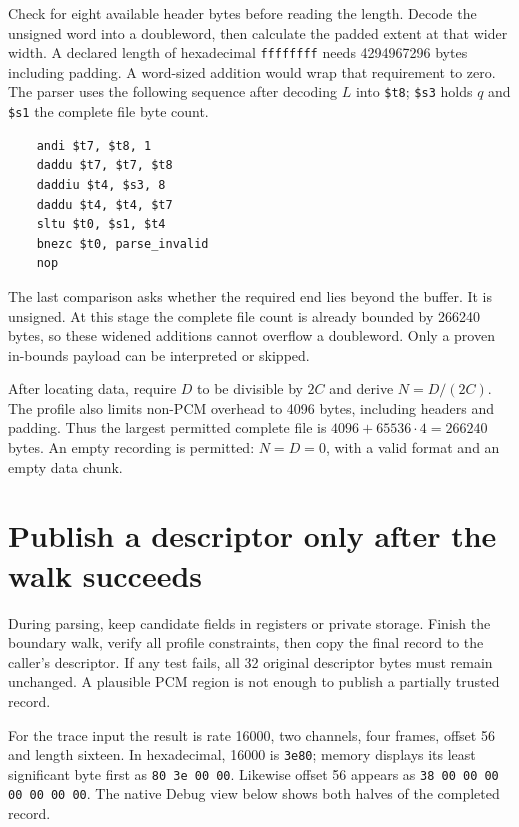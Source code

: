 Check for eight available header bytes before reading the length. Decode the
unsigned word into a doubleword, then calculate the padded extent at that wider
width. A declared length of hexadecimal \texttt{ffffffff} needs 4294967296
bytes including padding. A word-sized addition would wrap that requirement to
zero. The parser uses the following sequence after decoding $L$ into
\texttt{\$t8}; \texttt{\$s3} holds $q$ and \texttt{\$s1} the complete file
byte count.
\begin{verbatim}
    andi $t7, $t8, 1
    daddu $t7, $t7, $t8
    daddiu $t4, $s3, 8
    daddu $t4, $t4, $t7
    sltu $t0, $s1, $t4
    bnezc $t0, parse_invalid
    nop
\end{verbatim}
The last comparison asks whether the required end lies beyond the buffer. It
is unsigned. At this stage the complete file count is already bounded by
266240 bytes, so these widened additions cannot overflow a doubleword.
Only a proven in-bounds payload can be interpreted or skipped.

After locating data, require $D$ to be divisible by $2C$ and derive $N=D/(2C)$.
The profile also limits non-PCM overhead to 4096 bytes, including headers and
padding. Thus the largest permitted complete file is
$4096+65536\cdot4=266240$ bytes. An empty recording is permitted: $N=D=0$,
with a valid format and an empty data chunk.

\section{Publish a descriptor only after the walk succeeds}

During parsing, keep candidate fields in registers or private storage. Finish
the boundary walk, verify all profile constraints, then copy the final record
to the caller's descriptor. If any test fails, all 32 original descriptor bytes
must remain unchanged. A plausible PCM region is not enough to publish a
partially trusted record.

For the trace input the result is rate 16000, two channels, four frames, offset
56 and length sixteen. In hexadecimal, 16000 is \texttt{3e80}; memory displays
its least significant byte first as \texttt{80 3e 00 00}. Likewise offset 56
appears as \texttt{38 00 00 00 00 00 00 00}. The native Debug view below shows
both halves of the completed record.


